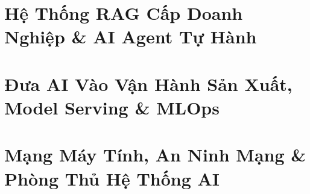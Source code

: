 \documentclass[11pt,a4paper,oneside]{book}
\begin{document}




\part{Hệ Thống RAG Cấp Doanh Nghiệp \& AI Agent Tự Hành}





\part{Đưa AI Vào Vận Hành Sản Xuất, Model Serving \& MLOps}





\part{Mạng Máy Tính, An Ninh Mạng \& Phòng Thủ Hệ Thống AI}



\end{document}

